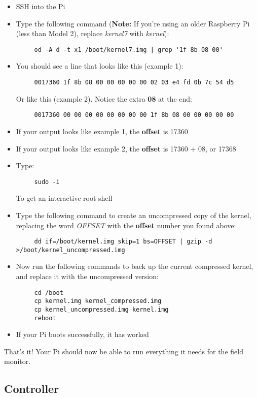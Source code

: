 \documentclass[10pt]{article}
\begin{document}
\begin{itemize}
 \item SSH into the Pi
 \item Type the following command (\textbf{Note:} If you're using an older Raspberry Pi (less than Model 2), replace \textit{kernel7} with \textit{kernel}):
	\begin{verbatim}
	 od -A d -t x1 /boot/kernel7.img | grep '1f 8b 08 00'
	\end{verbatim}
  \item You should see a line that looks like this (example 1):
	\begin{verbatim}
	 0017360 1f 8b 08 00 00 00 00 00 02 03 e4 fd 0b 7c 54 d5
	\end{verbatim}
	Or like this (example 2). Notice the extra \textbf{08} at the end:
	\begin{verbatim}
	 0017360 00 00 00 00 00 00 00 00 1f 8b 08 00 00 00 00 00
	\end{verbatim}
  \item If your output looks like example 1, the \textbf{offset} is 17360
  \item If your output looks like example 2, the \textbf{offset} is 17360 + 08, or 17368
  \item Type:
	\begin{verbatim}
	 sudo -i
	\end{verbatim}
	To get an interactive root shell
  \item Type the following command to create an uncompressed copy of the kernel, replacing the word \textit{OFFSET} with the \textbf{offset} number
	you found above:
	\begin{verbatim}
	 dd if=/boot/kernel.img skip=1 bs=OFFSET | gzip -d >/boot/kernel_uncompressed.img
	\end{verbatim}
  \item Now run the following commands to back up the current compressed kernel, and replace it with the uncompressed version:
	\begin{verbatim}
	 cd /boot
	 cp kernel.img kernel_compressed.img
	 cp kernel_uncompressed.img kernel.img
	 reboot
	\end{verbatim}
  \item If your Pi boots successfully, it has worked
\end{itemize}


That's it! Your Pi should now be able to run everything it needs for the field monitor.

\subsection{Controller}
\end{document}
